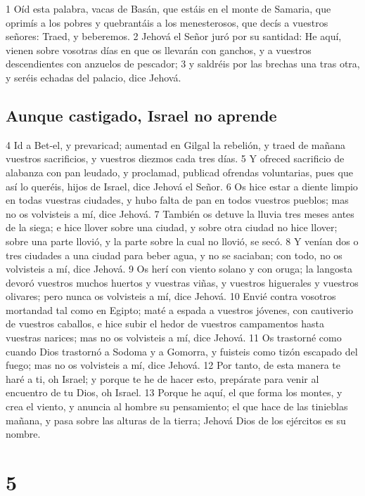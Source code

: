 1 Oíd esta palabra, vacas de Basán, que estáis en el monte de Samaria, que oprimís a los pobres y quebrantáis a los menesterosos, que decís a vuestros señores: Traed, y beberemos.
2 Jehová el Señor juró por su santidad: He aquí, vienen sobre vosotras días en que os llevarán con ganchos, y a vuestros descendientes con anzuelos de pescador;
3 y saldréis por las brechas una tras otra, y seréis echadas del palacio, dice Jehová.

\section*{Aunque castigado, Israel no aprende}

4 Id a Bet-el, y prevaricad; aumentad en Gilgal la rebelión, y traed de mañana vuestros sacrificios, y vuestros diezmos cada tres días.
5 Y ofreced sacrificio de alabanza con pan leudado, y proclamad, publicad ofrendas voluntarias, pues que así lo queréis, hijos de Israel, dice Jehová el Señor.
6 Os hice estar a diente limpio en todas vuestras ciudades, y hubo falta de pan en todos vuestros pueblos; mas no os volvisteis a mí, dice Jehová.
7 También os detuve la lluvia tres meses antes de la siega; e hice llover sobre una ciudad, y sobre otra ciudad no hice llover; sobre una parte llovió, y la parte sobre la cual no llovió, se secó.
8 Y venían dos o tres ciudades a una ciudad para beber agua, y no se saciaban; con todo, no os volvisteis a mí, dice Jehová.
9 Os herí con viento solano y con oruga; la langosta devoró vuestros muchos huertos y vuestras viñas, y vuestros higuerales y vuestros olivares; pero nunca os volvisteis a mí, dice Jehová.
10 Envié contra vosotros mortandad tal como en Egipto; maté a espada a vuestros jóvenes, con cautiverio de vuestros caballos, e hice subir el hedor de vuestros campamentos hasta vuestras narices; mas no os volvisteis a mí, dice Jehová.
11 Os trastorné como cuando Dios trastornó a Sodoma y a Gomorra, y fuisteis como tizón escapado del fuego; mas no os volvisteis a mí, dice Jehová.
12 Por tanto, de esta manera te haré a ti, oh Israel; y porque te he de hacer esto, prepárate para venir al encuentro de tu Dios, oh Israel.
13 Porque he aquí, el que forma los montes, y crea el viento, y anuncia al hombre su pensamiento; el que hace de las tinieblas mañana, y pasa sobre las alturas de la tierra; Jehová Dios de los ejércitos es su nombre.

\chapter{5}

